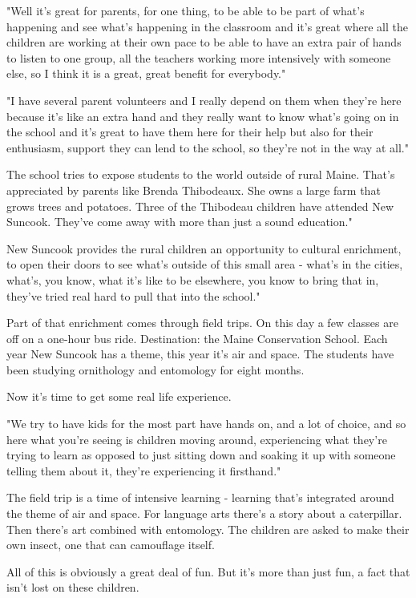 "Well it's great for parents, for one thing, to be able to be part of what's happening and see what's happening in the classroom and it's great where all the children are working at their own pace to be able to have an extra pair of hands to listen to one group, all the teachers working more intensively with someone else, so I think it is a great, great benefit for everybody."

"I have several parent volunteers and I really depend on them when they're here because it's like an extra hand and they really want to know what's going on in the school and it's great to have them here for their help but also for their enthusiasm, support they can lend to the school, so they're not in the way at all."

The school tries to expose students to the world outside of rural Maine. That's appreciated by parents like Brenda Thibodeaux. She owns a large farm that grows trees and potatoes. Three of the Thibodeau children have attended New Suncook. They've come away with more than just a sound education."

New Suncook provides the rural children an opportunity to cultural enrichment, to open their doors to see what's outside of this small area - what's in the cities, what's, you know, what it's like to be elsewhere, you know to bring that in, they've tried real hard to pull that into the school."

Part of that enrichment comes through field trips. On this day a few classes are off on a one-hour bus ride. Destination: the Maine Conservation School. Each year New Suncook has a theme, this year it's air and space. The students have been studying ornithology and entomology for eight months.

Now it's time to get some real life experience.

"We try to have kids for the most part have hands on, and a lot of choice, and so here what you're seeing is children moving around, experiencing what they're trying to learn as opposed to just sitting down and soaking it up with someone telling them about it, they're experiencing it firsthand."

The field trip is a time of intensive learning - learning that's integrated around the theme of air and space. For language arts there's a story about a caterpillar. Then there's art combined with entomology. The children are asked to make their own insect, one that can camouflage itself.

All of this is obviously a great deal of fun. But it's more than just fun, a fact that isn't lost on these children.


